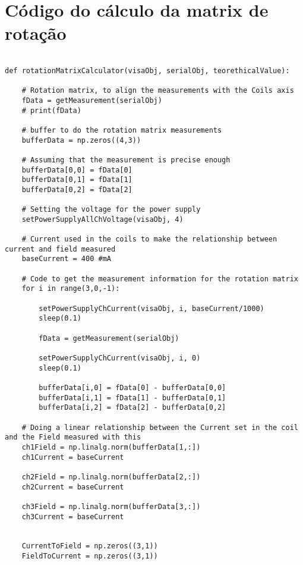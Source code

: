 \chapter{Código do cálculo da matrix de rotação}

\begin{verbatim}

def rotationMatrixCalculator(visaObj, serialObj, teorethicalValue):
    
    # Rotation matrix, to align the measurements with the Coils axis
    fData = getMeasurement(serialObj)    
    # print(fData)
    
    # buffer to do the rotation matrix measurements
    bufferData = np.zeros((4,3))
    
    # Assuming that the measurement is precise enough
    bufferData[0,0] = fData[0]
    bufferData[0,1] = fData[1]
    bufferData[0,2] = fData[2]
    
    # Setting the voltage for the power supply
    setPowerSupplyAllChVoltage(visaObj, 4)
    
    # Current used in the coils to make the relationship between current and field measured
    baseCurrent = 400 #mA
    
    # Code to get the measurement information for the rotation matrix
    for i in range(3,0,-1):
        
        setPowerSupplyChCurrent(visaObj, i, baseCurrent/1000)
        sleep(0.1)
        
        fData = getMeasurement(serialObj)
        
        setPowerSupplyChCurrent(visaObj, i, 0)
        sleep(0.1)    
        
        bufferData[i,0] = fData[0] - bufferData[0,0]
        bufferData[i,1] = fData[1] - bufferData[0,1]
        bufferData[i,2] = fData[2] - bufferData[0,2]
        
    # Doing a linear relationship between the Current set in the coil and the Field measured with this 
    ch1Field = np.linalg.norm(bufferData[1,:])
    ch1Current = baseCurrent
    
    ch2Field = np.linalg.norm(bufferData[2,:])
    ch2Current = baseCurrent
    
    ch3Field = np.linalg.norm(bufferData[3,:])
    ch3Current = baseCurrent
    
    
    CurrentToField = np.zeros((3,1))
    FieldToCurrent = np.zeros((3,1))
    

\end{verbatim}
